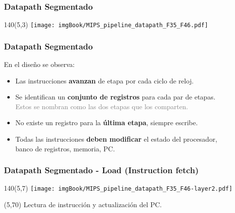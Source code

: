 \documentclass[aspectratio=169]{beamer}
\begin{document}
\begin{frame}[t,fragile]
    \frametitle{Datapath Segmentado}
    \begin{textblock}{140}(5,3)
    \texttt{[image: imgBook/MIPS\_pipeline\_datapath\_F35\_F46.pdf]}
    \end{textblock}
\end{frame}

\begin{frame}[t,fragile]
    \frametitle{Datapath Segmentado}
    \vspace{0.5cm}
    En el diseño se observa:\\
    \bigskip
    \begin{itemize}
    \setlength\itemsep{0.2cm}
    \item<2-> Las instrucciones \textbf{avanzan} de etapa por cada ciclo de reloj.
    \item<3-> Se identifican un \textbf{conjunto de registros} para cada par de etapas.\\
    \textcolor{gray}{Estos se nombran como las dos etapas que los comparten.}
    \item<4-> No existe un registro para la \textbf{última etapa}, siempre escribe.
    \item<5-> Todas las instrucciones \textbf{deben modificar} el estado del procesador,\\
    banco de registros, memoria, PC.
    \end{itemize}
    \bigskip
\end{frame}

\begin{frame}[t,fragile]
    \frametitle{Datapath Segmentado - Load \large (Instruction fetch)}
    \begin{textblock}{140}(5,7) \texttt{[image: imgBook/MIPS\_pipeline\_datapath\_F35\_F46-layer2.pdf]} \end{textblock}
    \begin{textblock}{30}(5,70) \footnotesize
    Lectura de instrucción y actualización del PC.
    \end{textblock}
\end{frame}
\end{document}
